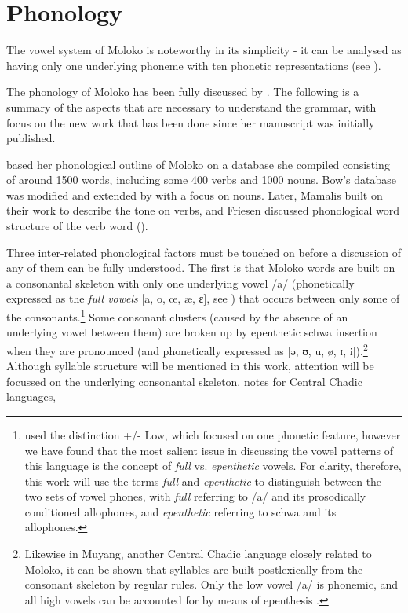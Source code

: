 \chapter[Phonology]{Phonology}\setcounter{equation}{0}\label{chap:2}
\makeatletter{}\makeatother
\hypertarget{RefHeading1210401525720847}{}
The vowel system of Moloko is noteworthy in its simplicity - it can be analysed as having only one underlying phoneme with ten phonetic representations (see ).

The phonology of Moloko has been fully discussed by \citet{Bow1997c}. The following is a summary of the aspects that are necessary to understand the grammar, with focus on the new work that has been done since her manuscript was initially published. 

\citet{Bow1997c} based her phonological outline of Moloko on a database she compiled consisting of around 1500 words, including some 400 verbs and 1000 nouns.  Bow’s database was modified and extended by \citet{Boyd2002} with a focus on nouns. Later, Mamalis built on their work to describe the tone on verbs, and Friesen discussed phonological word structure of the verb word (\citealt{FriesenMamalis2008}).  

Three inter-related phonological factors must be touched on before a discussion of any of them can be fully understood. The first is that Moloko words are built on a consonantal skeleton with only one underlying vowel /a/ (phonetically expressed as the \textit{full vowels} [a, o, œ, \ae, ɛ], see ) that occurs between only some of the consonants.\footnote{\citet{Bow1997c} used the distinction +/- Low, which focused on one phonetic feature, however we have found that the most salient issue in discussing the vowel patterns of this language is the concept of \textit{full} vs. \textit{epenthetic} vowels.  For clarity, therefore, this work will use the terms \textit{full} and \textit{epenthetic} to distinguish between the two sets of vowel phones, with \textit{full} referring to /a/ and its prosodically conditioned allophones, and \textit{epenthetic} referring to schwa and its allophones.} Some consonant clusters (caused by the absence of an underlying vowel between them) are broken up by epenthetic schwa insertion when they are pronounced (and phonetically expressed as [ə, ʊ, u, ø, ɪ, i]).\footnote{Likewise in Muyang, another Central Chadic language closely related to Moloko, it can be shown that syllables are built postlexically from the consonant skeleton by regular rules. Only the low vowel /a/ is phonemic, and all high vowels can be accounted for by means of epenthesis \citep{Smith1999}.} Although syllable structure will be mentioned in this work, attention will be focussed on the underlying consonantal skeleton. \citet[15]{Roberts2001} notes for Central Chadic languages, 

